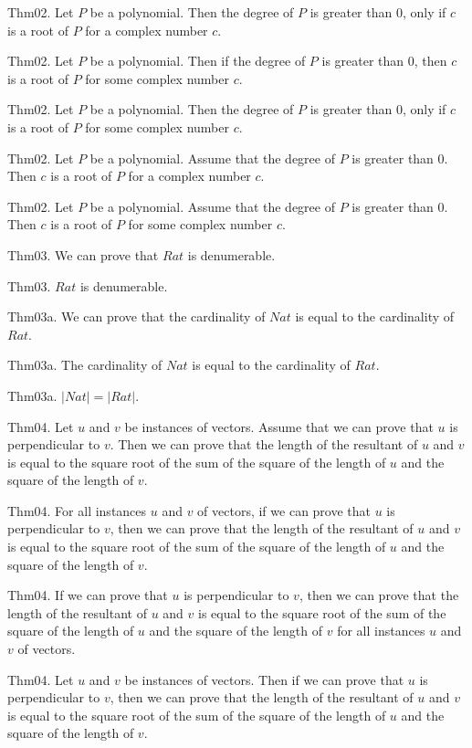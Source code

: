 \documentclass{article}
\begin{document}
Thm02. Let $P$ be a polynomial. Then the degree of $P$ is greater than $0$, only if $c$ is a root of $P$ for a complex number $c$.

Thm02. Let $P$ be a polynomial. Then if the degree of $P$ is greater than $0$, then $c$ is a root of $P$ for some complex number $c$.

Thm02. Let $P$ be a polynomial. Then the degree of $P$ is greater than $0$, only if $c$ is a root of $P$ for some complex number $c$.

Thm02. Let $P$ be a polynomial. Assume that the degree of $P$ is greater than $0$. Then $c$ is a root of $P$ for a complex number $c$.

Thm02. Let $P$ be a polynomial. Assume that the degree of $P$ is greater than $0$. Then $c$ is a root of $P$ for some complex number $c$.

Thm03. We can prove that $Rat$ is denumerable.

Thm03. $Rat$ is denumerable.

Thm03a. We can prove that the cardinality of $Nat$ is equal to the cardinality of $Rat$.

Thm03a. The cardinality of $Nat$ is equal to the cardinality of $Rat$.

Thm03a. $| Nat | = | Rat |$.

Thm04. Let $u$ and $v$ be instances of vectors. Assume that we can prove that $u$ is perpendicular to $v$. Then we can prove that the length of the resultant of $u$ and $v$ is equal to the square root of the sum of the square of the length of $u$ and the square of the length of $v$.

Thm04. For all instances $u$ and $v$ of vectors, if we can prove that $u$ is perpendicular to $v$, then we can prove that the length of the resultant of $u$ and $v$ is equal to the square root of the sum of the square of the length of $u$ and the square of the length of $v$.

Thm04. If we can prove that $u$ is perpendicular to $v$, then we can prove that the length of the resultant of $u$ and $v$ is equal to the square root of the sum of the square of the length of $u$ and the square of the length of $v$ for all instances $u$ and $v$ of vectors.

Thm04. Let $u$ and $v$ be instances of vectors. Then if we can prove that $u$ is perpendicular to $v$, then we can prove that the length of the resultant of $u$ and $v$ is equal to the square root of the sum of the square of the length of $u$ and the square of the length of $v$.
\end{document}
